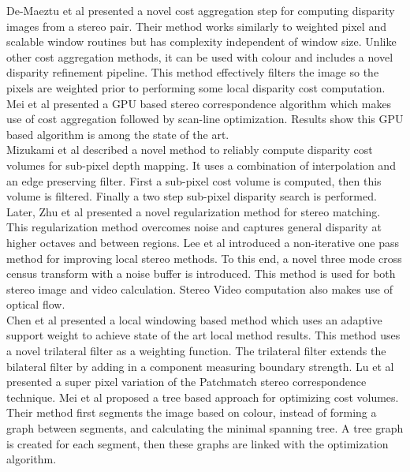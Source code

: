 De-Maeztu et al \cite{De11Linear} presented a novel cost aggregation step for computing disparity images from a stereo pair. Their method works similarly to weighted pixel and scalable window routines but has complexity independent of window size. Unlike other cost aggregation methods, it can be used with colour and includes a novel disparity refinement pipeline. This method effectively filters the image so the pixels are weighted prior to performing some local disparity cost computation. Mei et al \cite{Mei11Building} presented a GPU based stereo correspondence algorithm which makes use of cost aggregation followed by scan-line optimization. Results show this GPU based algorithm is among the state of the art. \\


Mizukami et al \cite{Mizukami12Sub} described a novel method to reliably compute disparity cost volumes for sub-pixel depth mapping. It uses a combination of interpolation and an edge preserving filter. First a sub-pixel cost volume is computed, then this volume is filtered. Finally a two step sub-pixel disparity search is performed. Later, Zhu et al \cite{Zhu12Locally} presented a novel regularization method for stereo matching. This regularization method overcomes noise and captures general disparity at higher octaves and between regions. Lee et al \cite{Lee13Local} introduced a non-iterative one pass method for improving local stereo methods. To this end, a novel three mode cross census transform with a noise buffer is introduced. This method is used for both stereo image and video calculation. Stereo Video computation also makes use of optical flow. \\


Chen et al \cite{Chen13Novel} presented a local windowing based method which uses an adaptive support weight to achieve state of the art local method results. This method uses a novel trilateral filter as a weighting function. The trilateral filter extends the bilateral filter by adding in a component measuring boundary strength. Lu et al \cite{Lu13Patch} presented a super pixel variation of the Patchmatch stereo correspondence technique. Mei et al \cite{Mei13Segment} proposed a tree based approach for optimizing cost volumes. Their method first segments the image based on colour, instead of forming a graph between segments, and calculating the minimal spanning tree. A tree graph is created for each segment, then these graphs are linked with the optimization algorithm.\\


